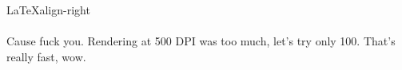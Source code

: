 \documentclass[12pt]{article}
\begin{document}
\LaTeX{align-right}\\\\
Cause fuck you.
Rendering at 500 DPI was too much, let's try only 100. That's really fast, wow.
\end{document}
